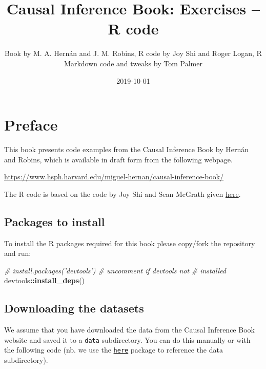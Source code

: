 \documentclass[10pt,]{book}
\title{Causal Inference Book: Exercises -- R code}
\author{Book by M. A. Hernán and J. M. Robins, R code by Joy Shi and Roger Logan, R Markdown code and tweaks by Tom Palmer}
\date{2019-10-01}
\newenvironment{Shaded}{\begin{snugshade}}{\end{snugshade}}
\newcommand{\CommentTok}[1]{\textcolor[rgb]{0.56,0.35,0.01}{\textit{#1}}}
\newcommand{\KeywordTok}[1]{\textcolor[rgb]{0.13,0.29,0.53}{\textbf{#1}}}
\newcommand{\NormalTok}[1]{#1}
\newcommand{\OperatorTok}[1]{\textcolor[rgb]{0.81,0.36,0.00}{\textbf{#1}}}
\begin{document}
\maketitle

\thispagestyle{empty}

{
\setcounter{tocdepth}{1}
\tableofcontents
}
\hypertarget{preface}{%
\chapter*{Preface}\label{preface}}

This book presents code examples from the Causal Inference Book by Hernán and Robins, which is available in draft form from the following webpage.

\url{https://www.hsph.harvard.edu/miguel-hernan/causal-inference-book/}

The R code is based on the code by Joy Shi and Sean McGrath given \href{https://cdn1.sph.harvard.edu/wp-content/uploads/sites/1268/1268/20/Rcode_CIpart2.zip}{here}.

\hypertarget{packages-to-install}{%
\section{Packages to install}\label{packages-to-install}}

To install the R packages required for this book please copy/fork the repository and run:

\begin{Shaded}
\begin{Highlighting}[]
\CommentTok{# install.packages('devtools') # uncomment if devtools not}
\CommentTok{# installed}
\NormalTok{devtools}\OperatorTok{::}\KeywordTok{install_deps}\NormalTok{()}
\end{Highlighting}
\end{Shaded}

\hypertarget{downloading-the-datasets}{%
\section{Downloading the datasets}\label{downloading-the-datasets}}

We assume that you have downloaded the data from the Causal Inference Book website and saved it to a \texttt{data} subdirectory. You can do this manually or with the following code (nb. we use the \href{https://here.r-lib.org/}{\texttt{here}} package to reference the data subdirectory).
\end{document}
